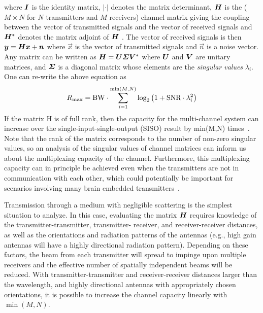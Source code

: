 where $\mat{I}$ is the identity matrix, $|\cdot|$ denotes the matrix determinant, $\mat{H}$ is the ($M \times N$ for $N$ transmitters and $M$ receivers) channel matrix giving the coupling between the vector of transmitted signals and the vector of received signals and $\mat{H}^*$ denotes the matrix adjoint of $\mat{H}$ \cite{tulino04}. The vector of received signals is then $\vec{y}=\mat{H}\vec{x}+\vec{n}$ where $\vec{x}$ is the vector of transmitted signals and $\vec{n}$ is a noise vector. Any matrix can be written as $\mat{H}=\mat{U}\mat{\Sigma}\mat{V}^*$ where $\mat{U}$ and $\mat{V}$ are unitary matrices, and $\mat{\Sigma}$ is a diagonal matrix whose elements are the \emph{singular values} $\lambda_i$. One can re-write the above equation as
\[R_{\text{\scriptsize max}} = \text{BW} \cdot \sum_{i=1}^{\min(M,N)} \log_2\left(1+\text{SNR} \cdot \lambda_i^2\right)\]
If the matrix H is of full rank, then the capacity for the multi-channel system can increase over the single-input-single-output (SISO) result by min(M,N) times~\cite{shiu00}.
Note that the rank of the matrix corresponds to the number of non-zero singular values, so an analysis of the singular values of channel matrices can inform us about the multiplexing capacity of the channel.
Furthermore, this multiplexing capacity can in principle be achieved even when the transmitters are not in communication with each other, which could potentially be important for scenarios involving many brain embedded transmitters~\cite{spencer04}.

Transmission through a medium with negligible scattering is the simplest situation to analyze.
In this case, evaluating the matrix $\mat{H}$ requires knowledge of the transmitter-transmitter, transmitter- receiver, and receiver-receiver distances, as well as the orientations and radiation patterns of the antennas (e.g., high gain antennas will have a highly directional radiation pattern).
Depending on these factors, the beam from each transmitter will spread to impinge upon multiple receivers and the effective number of spatially independent beams will be reduced.
With transmitter-transmitter and receiver-receiver distances larger than the wavelength, and highly directional antennas with appropriately chosen orientations, it is possible to increase the channel capacity linearly with $\min(M,N)$.

